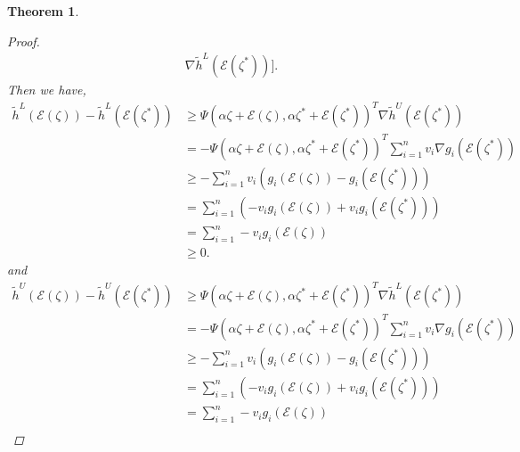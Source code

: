 \documentclass[12pt, reqno]{amsart}
\newtheorem{theorem}{Theorem}[section]
\theoremstyle{definition}
\theoremstyle{remark}
\numberwithin{equation}{section}
\begin{document}
\begin{theorem}
\begin{proof}
\begin{align*}
    \nabla \tilde{h}^L(\mathcal{\mathcal{E}}(\mathit{\zeta^*} )) 
    \big].
\end{align*}
Then we have,
\begin{equation*}
\begin{aligned}
\tilde{h}^L(\mathcal{\mathcal{E}}(\mathit{\zeta} )) - \tilde{h}^L(\mathcal{\mathcal{E}}(\mathit{\zeta} ^*)) &\geq \Psi(\alpha \mathit{\zeta} +\mathcal{\mathcal{E}}(\mathit{\zeta} ),\alpha \mathit{\zeta} ^*+\mathcal{\mathcal{E}}(\mathit{\zeta} ^*))^T \nabla\tilde{h}^U(\mathcal{\mathcal{E}}(\mathit{\zeta} ^*))  \\
&= -\Psi(\alpha \mathit{\zeta} +\mathcal{\mathcal{E}}(\mathit{\zeta} ),\alpha \mathit{\zeta} ^*+\mathcal{\mathcal{E}}(\mathit{\zeta} ^*))^T \sum_{i=1}^{n} v_i \nabla g_i(\mathcal{\mathcal{E}}(\mathit{\zeta} ^*)) \\
&\geq - \sum_{i=1}^{n} v_i (g_i(\mathcal{\mathcal{E}}(\mathit{\zeta} )) - g_i(\mathcal{\mathcal{E}}(\mathit{\zeta} ^*))) \\
&= \sum_{i=1}^{n} \left( -v_i g_i(\mathcal{\mathcal{E}}(\mathit{\zeta} )) + v_i g_i(\mathcal{\mathcal{E}}(\mathit{\zeta} ^*)) \right) \\
&= \sum_{i=1}^{n} -v_i g_i(\mathcal{\mathcal{E}}(\mathit{\zeta} )) \\
&\geq 0.
    \end{aligned}
\end{equation*}
and 
\begin{equation*}
\begin{aligned}
\tilde{h}^U(\mathcal{\mathcal{E}}(\mathit{\zeta} )) - \tilde{h}^U(\mathcal{\mathcal{E}}(\mathit{\zeta} ^*)) &\geq \Psi(\alpha \mathit{\zeta} +\mathcal{\mathcal{E}}(\mathit{\zeta} ),\alpha \mathit{\zeta} ^*+\mathcal{\mathcal{E}}(\mathit{\zeta} ^*))^T \nabla\tilde{h}^L(\mathcal{\mathcal{E}}(\mathit{\zeta} ^*))  \\
&= -\Psi(\alpha \mathit{\zeta} +\mathcal{\mathcal{E}}(\mathit{\zeta} ),\alpha \mathit{\zeta} ^*+\mathcal{\mathcal{E}}(\mathit{\zeta} ^*))^T \sum_{i=1}^{n} v_i \nabla g_i(\mathcal{\mathcal{E}}(\mathit{\zeta} ^*)) \\
&\geq - \sum_{i=1}^{n} v_i (g_i(\mathcal{\mathcal{E}}(\mathit{\zeta} )) - g_i(\mathcal{\mathcal{E}}(\mathit{\zeta} ^*))) \\
&= \sum_{i=1}^{n} \left( -v_i g_i(\mathcal{\mathcal{E}}(\mathit{\zeta} )) + v_i g_i(\mathcal{\mathcal{E}}(\mathit{\zeta} ^*)) \right) \\
&= \sum_{i=1}^{n} -v_i g_i(\mathcal{\mathcal{E}}(\mathit{\zeta} )) \\

\end{aligned}
\end{equation*}
\end{proof}
\end{theorem}
\end{document}
